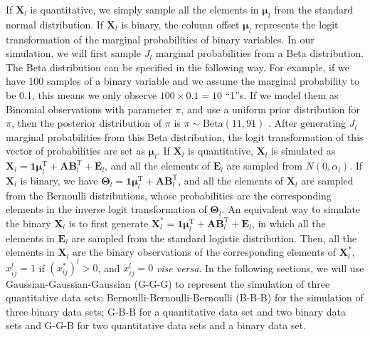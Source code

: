 If $\mathbf{X}_l$ is quantitative, we simply sample all the elements in $\bm{\mu}_l$ from the standard normal distribution. If $\mathbf{X}_l$ is binary, the column offset $\bm{\mu}_l$ represents the logit transformation of the marginal probabilities of binary variables. In our simulation, we will first sample $J_l$ marginal probabilities from a Beta distribution. The Beta distribution can be specified in the following way. For example, if we have 100 samples of a binary variable and we assume the marginal probability to be 0.1, this means we only observe $100 \times 0.1 = 10$ ``1''s. If we model them as Binomial observations with parameter $\pi$, and use a uniform prior distribution for $\pi$, then the posterior distribution of $\pi$ is $\pi \sim \text{Beta}(11, 91)$ \cite{gelman2013bayesian}. After generating $J_l$ marginal probabilities from this Beta distribution, the logit transformation of this vector of probabilities are set as $\bm{\mu}_l$. If $\mathbf{X}_l$ is quantitative, $\mathbf{X}_l$ is simulated as $\mathbf{X}_l = \mathbf{1}\bm{\mu}_l^{\text{T}} + \mathbf{A}\mathbf{B}_l^{\text{T}} + \mathbf{E}_l$, and all the elements of $\mathbf{E}_l$ are sampled from $N(0,\alpha_l)$. If $\mathbf{X}_l$ is binary, we have $\mathbf{\Theta}_l = \mathbf{1}\bm{\mu}_l^{\text{T}} + \mathbf{A}\mathbf{B}_l^{\text{T}}$, and all the elements of $\mathbf{X}_l$ are sampled from the Bernoulli distributions, whose probabilities are the corresponding elements in the inverse logit transformation of $\mathbf{\Theta}_l$. An equivalent way to simulate the binary $\mathbf{X}_l$ is to first generate $\mathbf{X}_l^{\ast} = \mathbf{1}\bm{\mu}_l^{\text{T}} + \mathbf{A}\mathbf{B}_l^{\text{T}} + \mathbf{E}_l$, in which all the elements in $\mathbf{E}_l$ are sampled from the standard logistic distribution. Then, all the elements in $\mathbf{X}_l$ are the binary observations of the corresponding elements of $\mathbf{X}_l^{\ast}$, $x_{ij}^{l}=1$ if $(x_{ij}^{\ast})^{l} > 0$, and $x_{ij}^{l}=0$ \textit{vise versa}. In the following sections, we will use Gaussian-Gaussian-Gaussian (G-G-G) to represent the simulation of three quantitative data sets; Bernoulli-Bernoulli-Bernoulli (B-B-B) for the simulation of three binary data sets; G-B-B for a quantitative data set and two binary data sets and G-G-B for two quantitative data sets and a binary data set.

